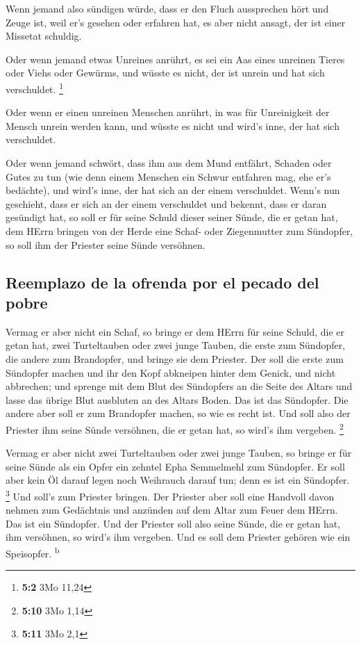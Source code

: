  Wenn jemand also sündigen würde, dass er den Fluch
aussprechen hört und Zeuge ist, weil er's gesehen oder erfahren hat, es
aber nicht ansagt, der ist einer Missetat schuldig.

 Oder wenn jemand etwas Unreines anrührt, es sei ein Aas
eines unreinen Tieres oder Viehs oder Gewürms, und wüsste es nicht, der
ist unrein und hat sich verschuldet. \footnote{\textbf{5:2} 3Mo 11,24}

 Oder wenn er einen unreinen Menschen anrührt, in was für
Unreinigkeit der Mensch unrein werden kann, und wüsste es nicht und
wird's inne, der hat sich verschuldet.

 Oder wenn jemand schwört, dass ihm aus dem Mund entfährt,
Schaden oder Gutes zu tun (wie denn einem Menschen ein Schwur entfahren
mag, ehe er's bedächte), und wird's inne, der hat sich an der einem
verschuldet.  Wenn's nun geschieht, dass er sich an der
einem verschuldet und bekennt, dass er daran gesündigt hat,
 so soll er für seine Schuld dieser seiner Sünde, die er
getan hat, dem HErrn bringen von der Herde eine Schaf- oder Ziegenmutter
zum Sündopfer, so soll ihm der Priester seine Sünde versöhnen.

\hypertarget{reemplazo-de-la-ofrenda-por-el-pecado-del-pobre}{%
\subsection{Reemplazo de la ofrenda por el pecado del
pobre}\label{reemplazo-de-la-ofrenda-por-el-pecado-del-pobre}}

 Vermag er aber nicht ein Schaf, so bringe er dem HErrn
für seine Schuld, die er getan hat, zwei Turteltauben oder zwei junge
Tauben, die erste zum Sündopfer, die andere zum Brandopfer,
 und bringe sie dem Priester. Der soll die erste zum
Sündopfer machen und ihr den Kopf abkneipen hinter dem Genick, und nicht
abbrechen;  und sprenge mit dem Blut des Sündopfers an die
Seite des Altars und lasse das übrige Blut ausbluten an des Altars
Boden. Das ist das Sündopfer.  Die andere aber soll er
zum Brandopfer machen, so wie es recht ist. Und soll also der Priester
ihm seine Sünde versöhnen, die er getan hat, so wird's ihm vergeben.
\footnote{\textbf{5:10} 3Mo 1,14}

 Vermag er aber nicht zwei Turteltauben oder zwei junge
Tauben, so bringe er für seine Sünde als ein Opfer ein zehntel Epha
Semmelmehl zum Sündopfer. Er soll aber kein Öl darauf legen noch
Weihrauch darauf tun; denn es ist ein Sündopfer. \footnote{\textbf{5:11}
  3Mo 2,1}  Und soll's zum Priester bringen. Der Priester
aber soll eine Handvoll davon nehmen zum Gedächtnis und anzünden auf dem
Altar zum Feuer dem HErrn. Das ist ein Sündopfer.  Und
der Priester soll also seine Sünde, die er getan hat, ihm versöhnen, so
wird's ihm vergeben. Und es soll dem Priester gehören wie ein
Speisopfer. \textsuperscript{b}

